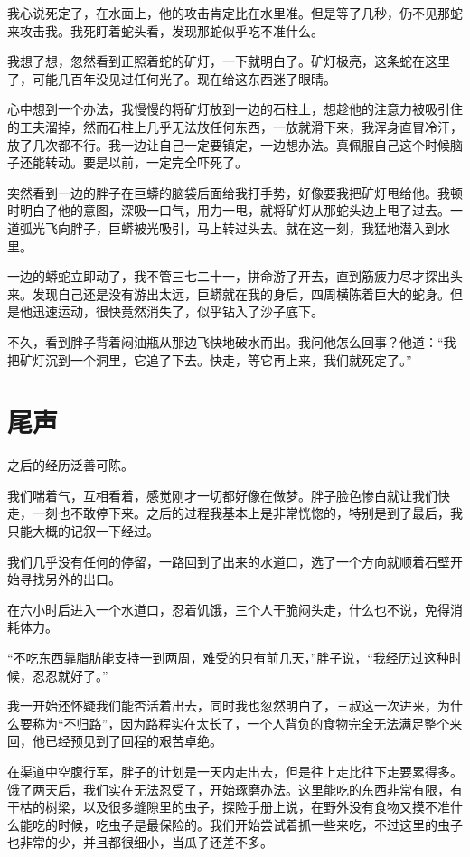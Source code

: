 我心说死定了，在水面上，他的攻击肯定比在水里准。但是等了几秒，仍不见那蛇来攻击我。我死盯着蛇头看，发现那蛇似乎吃不准什么。

我想了想，忽然看到正照着蛇的矿灯，一下就明白了。矿灯极亮，这条蛇在这里了，可能几百年没见过任何光了。现在给这东西迷了眼睛。

心中想到一个办法，我慢慢的将矿灯放到一边的石柱上，想趁他的注意力被吸引住的工夫溜掉，然而石柱上几乎无法放任何东西，一放就滑下来，我浑身直冒冷汗，放了几次都不行。我一边让自己一定要镇定，一边想办法。真佩服自己这个时候脑子还能转动。要是以前，一定完全吓死了。

突然看到一边的胖子在巨蟒的脑袋后面给我打手势，好像要我把矿灯甩给他。我顿时明白了他的意图，深吸一口气，用力一甩，就将矿灯从那蛇头边上甩了过去。一道弧光飞向胖子，巨蟒被光吸引，马上转过头去。就在这一刻，我猛地潜入到水里。

一边的蟒蛇立即动了，我不管三七二十一，拼命游了开去，直到筋疲力尽才探出头来。发现自己还是没有游出太远，巨蟒就在我的身后，四周横陈着巨大的蛇身。但是他迅速运动，很快竟然消失了，似乎钻入了沙子底下。

不久，看到胖子背着闷油瓶从那边飞快地破水而出。我问他怎么回事？他道：“我把矿灯沉到一个洞里，它追了下去。快走，等它再上来，我们就死定了。”

\chapter{尾声}

之后的经历泛善可陈。

我们喘着气，互相看着，感觉刚才一切都好像在做梦。胖子脸色惨白就让我们快走，一刻也不敢停下来。之后的过程我基本上是非常恍惚的，特别是到了最后，我只能大概的记叙一下经过。

我们几乎没有任何的停留，一路回到了出来的水道口，选了一个方向就顺着石壁开始寻找另外的出口。

在六小时后进入一个水道口，忍着饥饿，三个人干脆闷头走，什么也不说，免得消耗体力。

“不吃东西靠脂肪能支持一到两周，难受的只有前几天，”胖子说，“我经历过这种时候，忍忍就好了。”

我一开始还怀疑我们能否活着出去，同时我也忽然明白了，三叔这一次进来，为什么要称为“不归路”，因为路程实在太长了，一个人背负的食物完全无法满足整个来回，他已经预见到了回程的艰苦卓绝。

在渠道中空腹行军，胖子的计划是一天内走出去，但是往上走比往下走要累得多。饿了两天后，我们实在无法忍受了，开始琢磨办法。这里能吃的东西非常有限，有干枯的树梁，以及很多缝隙里的虫子，探险手册上说，在野外没有食物又摸不准什么能吃的时候，吃虫子是最保险的。我们开始尝试着抓一些来吃，不过这里的虫子也非常的少，并且都很细小，当瓜子还差不多。

